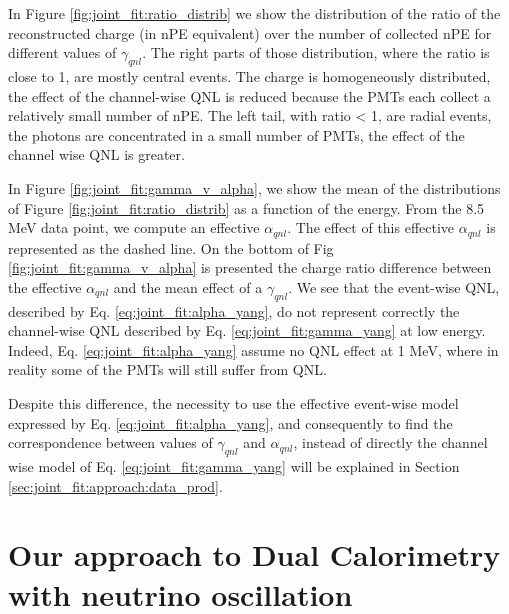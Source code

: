 \documentclass[../main.tex]{subfiles}
\begin{document}
In Figure \ref{fig:joint_fit:ratio_distrib} we show the distribution of the ratio of the reconstructed charge (in nPE equivalent) over the number of collected nPE for different values of $\gamma_{qnl}$. The right parts of those distribution, where the ratio is close to 1, are mostly central events. The charge is homogeneously distributed, the effect of the channel-wise QNL is reduced because the PMTs each collect a relatively small number of nPE. The left tail, with ratio < 1, are radial events, the photons are concentrated in a small number of PMTs, the effect of the channel wise QNL is greater.

In Figure \ref{fig:joint_fit:gamma_v_alpha}, we show the mean of the distributions of Figure \ref{fig:joint_fit:ratio_distrib} as a function of the energy. From the 8.5 MeV data point, we compute an effective $\alpha_{qnl}$. The effect of this effective $\alpha_{qnl}$ is represented as the dashed line. On the bottom of Fig \ref{fig:joint_fit:gamma_v_alpha} is presented the charge ratio difference between the effective $\alpha_{qnl}$ and the mean effect of a $\gamma_{qnl}$. We see that the event-wise QNL, described by Eq. \ref{eq:joint_fit:alpha_yang}, do not represent correctly the channel-wise QNL described by Eq. \ref{eq:joint_fit:gamma_yang} at low energy. Indeed, Eq. \ref{eq:joint_fit:alpha_yang} assume no QNL effect at 1 MeV, where in reality some of the PMTs will still suffer from QNL.

Despite this difference, the necessity to use the effective event-wise model expressed by Eq. \ref{eq:joint_fit:alpha_yang}, and consequently to find the correspondence between values of $\gamma_{qnl}$ and $\alpha_{qnl}$, instead of directly the channel wise model of Eq. \ref{eq:joint_fit:gamma_yang} will be explained in Section \ref{sec:joint_fit:approach:data_prod}.

%
%
%

\section{Our approach to Dual Calorimetry with neutrino oscillation}
\label{sec:joint_fit:approach}
\end{document}
